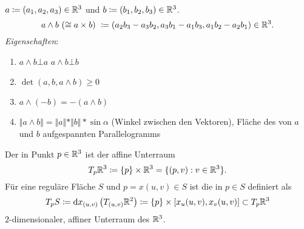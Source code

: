 \begin{remark}
  \ \\
  $ a \coloneqq (a_1, a_2, a_3) \in \mathbb{R}^3 $ und $ b \coloneqq (b_1, b_2, b_3) \in \mathbb{R}^3 $.
  \begin{equation*}
    a \wedge b \ (\cong a \times b) \ \coloneqq (a_2b_3-a_3b_2, a_3b_1-a_1b_3, a_1b_2-a_2b_1) \in \mathbb{R}^3\text{.}
  \end{equation*}
  \emph{Eigenschaften}:
  \begin{enumerate}
    \item $ a \wedge b \bot a $ \quad $ a \wedge b \bot b $ 
    \item $ \det(a, b, a \wedge b) \geq 0 $
    \item $ a \wedge (-b) = - (a \wedge b) $
    \item $ \Vert a \wedge b \Vert = \Vert a \Vert * \Vert b \Vert * \sin \alpha $ (Winkel zwischen den Vektoren), Fläche des von $ a $ und $ b $ aufgespannten Parallelogramms
  \end{enumerate}
\end{remark}

\begin{definition}[Tangentialraum]
  Der \label{def:tangentialraum} in Punkt $ p \in \mathbb{R}^3 $ ist der affine Unterraum
  \begin{equation*}
    T_p\mathbb{R}^3 \coloneqq \{ p \} \times \mathbb{R}^3 = \{ (p,v) : v \in \mathbb{R}^3 \}\text{.}
  \end{equation*}
  Für eine reguläre Fläche $ S $ und $ p = x(u,v) \in S $ ist die \label{def:tangentialebene} in $ p \in S $ definiert als
  \begin{equation*}
    T_pS \coloneqq \text{d}x_{(u,v)}\left(T_{(u,v)}\mathbb{R}^2\right) \coloneqq \{ p \} \times [x_u(u,v), x_v(u,v)] \subset T_p\mathbb{R}^3
  \end{equation*}
  $ 2 $-dimensionaler, affiner Unterraum des $ \mathbb{R}^3 $.
\end{definition}

